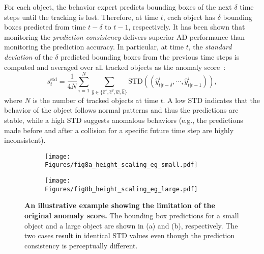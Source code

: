 For each object, the behavior expert predicts bounding boxes of the next $\delta$ time steps until the tracking is lost. Therefore, at time $t$, each object has $\delta$ bounding boxes predicted from time $t - \delta$ to $t - 1$, respectively. It has been shown that monitoring the \textit{prediction consistency} delivers superior AD performance than monitoring the prediction accuracy. In particular, at time $t$, the \textit{standard deviation} of the $\delta$ predicted bounding boxes from the previous time steps is computed and averaged over all tracked objects as the anomaly score~\citep{yao2022dota}:
\begin{equation}
\label{eq:fol-anomaly-score}
s_t^\text{std} = \frac{1}{4N} \sum_{i=1}^N \sum_{\hat{y} \in \{\hat{c}^x,\hat{c}^y,\hat{w},\hat{h}\}} \text{STD} ((\hat{y}_{t|t - \delta}^i, \cdots, \hat{y}_{t|t - 1}^i)),
\end{equation}
where $N$ is the number of tracked objects at time $t$. A low STD indicates that the behavior of the object follows normal patterns and thus the predictions are stable, while a high STD suggests anomalous behaviors (e.g., the predictions made before and after a collision for a specific future time step are highly inconsistent).

\begin{figure}[t]
  \centering
  \begin{subfigure}[b]{0.09\linewidth}
    \captionsetup{justification=centering}
    \texttt{[image: Figures/fig8a\_height\_scaling\_eg\_small.pdf]}
    \caption{}
    \label{subfig:height-scaling-eg-small}
  \end{subfigure} \hspace{5mm}
  \begin{subfigure}[b]{0.3\linewidth}
    \captionsetup{justification=centering}
    \texttt{[image: Figures/fig8b\_height\_scaling\_eg\_large.pdf]}
    \caption{}
    \label{subfig:height-scaling-eg-large}
  \end{subfigure}
  \caption{\textbf{An illustrative example showing the limitation of the original anomaly score.} The bounding box predictions for a small object and a large object are shown in (a) and (b), respectively. The two cases result in identical STD values even though the prediction consistency is perceptually different.}
  \label{fig:height-scaling-eg}
\end{figure}

